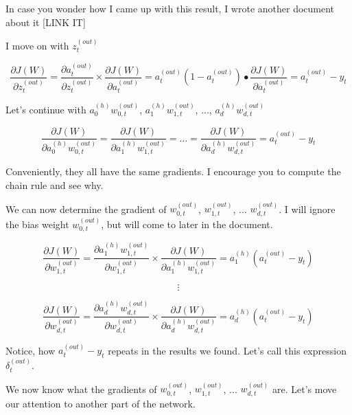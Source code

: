 \documentclass[../main.tex]{subfiles}
\begin{document}
In case you wonder how I came up with this result, I wrote another document about it [LINK IT]

\vspace{5mm} %

I move on with $z_{t}^{(out)}$

\[
    \frac{\partial J(W)}{\partial z_{t}^{(out)}} =
    \frac{\partial a_{t}^{(out)}}{\partial z_{t}^{(out)}} \times
    \frac{\partial J(W)}{\partial a_{t}^{(out)}} =
    a_{t}^{(out)}(1 - a_{t}^{(out)}) \bullet \frac{\partial J(W)}{\partial a_{t}^{(out)}} =
    a_{t}^{(out)} - y_t
\]

\vspace{5mm} %

Let's continue with $a_0^{(h)}w_{0,t}^{(out)}$, $a_1^{(h)}w_{1,t}^{(out)}$, ..., $a_d^{(h)}w_{d,t}^{(out)}$

\[
    \frac{\partial J(W)}{\partial a_0^{(h)}w_{0,t}^{(out)}} =
    \frac{\partial J(W)}{\partial a_1^{(h)}w_{1,t}^{(out)}} =
    \dots =
    \frac{\partial J(W)}{\partial a_d^{(h)}w_{d,t}^{(out)}} = 
    a_{t}^{(out)} - y_t
\]

\vspace{5mm} %

Conveniently, they all have the same gradients. I encourage you to compute the chain rule and see why.

\vspace{5mm} %

We can now determine the gradient of  $w_{0,t}^{(out)}$, $w_{1,t}^{(out)}$, ... $w_{d,t}^{(out)}$.
I will ignore the bias weight $w_{0,t}^{(out)}$, but will come to later in the document.

\pagebreak

\[
    \frac{\partial J(W)}{\partial w_{1,t}^{(out)}} =
    \frac{\partial a_1^{(h)}w_{1,t}^{(out)}}{\partial w_{1,t}^{(out)}} \times
    \frac{\partial J(W)}{\partial a_1^{(h)}w_{1,t}^{(out)}}  =
    a_1^{(h)}(a_{t}^{(out)} - y_{t})
\]

\[ \vdots \]

\[
    \frac{\partial J(W)}{\partial w_{d,t}^{(out)}} =
    \frac{\partial a_d^{(h)}w_{d,t}^{(out)}}{\partial w_{d,t}^{(out)}} \times
    \frac{\partial J(W)}{\partial a_d^{(h)}w_{d,t}^{(out)}}  =
    a_d^{(h)}(a_{t}^{(out)} - y_{t})
\]

Notice, how $a_{t}^{(out)} - y_{t}$ repeats in the results we found. 
Let's call this expression $\delta_t^{(out)}$.

\vspace{1cm} %

We now know what the gradients of $w_{0,t}^{(out)}$, $w_{1,t}^{(out)}$, ... $w_{d,t}^{(out)}$ are.
Let's move our attention to another part of the network.
\end{document}
